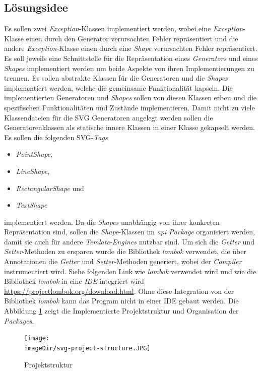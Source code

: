 \documentclass[11pt, a4paper, twoside]{article}   	%
\newcommand{\imageDir}{images}
\begin{document}
\subsection{Lösungsidee} Es sollen zwei \emph{Exception}-Klassen implementiert werden, wobei eine \emph{Exception}-Klasse einen durch den Generator verursachten Fehler repräsentiert und die andere \emph{Exception}-Klasse einen durch eine \emph{Shape} verursachten Fehler repräsentiert.
\newline
\newline
Es soll jeweils eine Schnittstelle für die Repräsentation eines \emph{Generators} und eines \emph{Shapes} implementiert werden um beide Aspekte von ihren Implementierungen zu trennen. Es sollen abstrakte Klassen für die Generatoren und die \emph{Shapes} implementiert werden, welche die gemeinsame Funktionalität kapseln. Die implementierten Generatoren und \emph{Shapes} sollen von diesen Klassen erben und die spezifischen Funktionalitäten und Zustände implementieren.
\newline
\newline
Damit nicht zu viele Klassendateien für die SVG Generatoren angelegt werden sollen die Generatorenklassen als statische innere Klassen in einer Klasse gekapselt werden. Es sollen die folgenden SVG-\emph{Tags}
\begin{itemize}
	\item\emph{PointShape},
	\item\emph{LineShape},
	\item\emph{RectangularShape} und
	\item\emph{TextShape}
\end{itemize}   
implementiert werden.
\newpage
Da die \emph{Shapes} unabhängig von ihrer konkreten Repräsentation sind, sollen die \emph{Shape}-Klassen im \emph{api Package} organisiert werden, damit sie auch für andere \emph{Temlate-Engines} nutzbar sind.
\newline
\newline
Um sich die \emph{Getter} und \emph{Setter}-Methoden zu ersparen wurde die Bibliothek \emph{lombok} verwendet, die über Annotationen die \emph{Getter} und \emph{Setter}-Methoden generiert, wobei der \emph{Compiler} instrumentiert wird. Siehe folgenden Link wie \emph{lombok} verwendet wird und wie die Bibliothek \emph{lombok} in eine \emph{IDE} integriert wird \url{https://projectlombok.org/download.html}.
\newline
\newline
Ohne diese Integration von der Bibliothek \emph{lombok} kann das Program nicht in einer IDE gebaut werden.
\newline
\newline
Die Abbildung \ref{fig:svg-project-structure} zeigt die Implementierte Projektstruktur und Organisation der \emph{Packages}.
\newline
\begin{figure}[h]
	\centering
	\texttt{[image: \\imageDir/svg-project-structure.JPG]}
	\caption{Projektstruktur}
	\label{fig:svg-project-structure}
\end{figure}
\ \newpage
\end{document}
